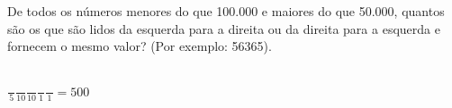 \begin{ex}
 	De todos os números menores do que 100.000 e maiores do que 50.000, quantos são os que são lidos da esquerda para a direita ou da direita para a esquerda e fornecem o mesmo valor? (Por exemplo: 56365).  
 	   \begin{sol}
 	      \phantom{A}  \\
 	      $\frac{\phantom{A}}{5}\frac{\phantom{A}}{10}\frac{\phantom{A}}{10}\frac{\phantom{A}}{1}\frac{\phantom{A}}{1}= 500$
 	   \end{sol}
\end{ex}